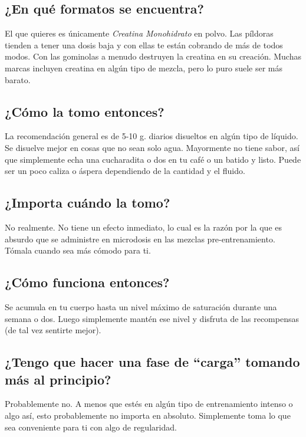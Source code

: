 \documentclass{article}
\begin{document}
\subsection{¿En qué formatos se encuentra?}

El que quieres es únicamente \textit{Creatina Monohidrato} en polvo. Las píldoras tienden a tener una dosis baja y con ellas te están cobrando de más de todos modos. Con las gominolas a menudo destruyen la creatina en su creación. Muchas marcas incluyen creatina en algún tipo de mezcla, pero lo puro suele ser más barato.

\subsection{¿Cómo la tomo entonces?}

La recomendación general es de 5-10 g. diarios disueltos en algún tipo de líquido. Se disuelve mejor en cosas que no sean solo agua. Mayormente no tiene sabor, así que simplemente echa una cucharadita o dos en tu café o un batido y listo. Puede ser un poco caliza o áspera dependiendo de la cantidad y el fluido.

\subsection{¿Importa cuándo la tomo?}

No realmente. No tiene un efecto inmediato, lo cual es la razón por la que es absurdo que se administre en microdosis en las mezclas pre-entrenamiento. Tómala cuando sea más cómodo para ti.

\subsection{¿Cómo funciona entonces?}

Se acumula en tu cuerpo hasta un nivel máximo de saturación durante una semana o dos. Luego simplemente mantén ese nivel y disfruta de las recompensas (de tal vez sentirte mejor).

\subsection{¿Tengo que hacer una fase de “carga” tomando más al principio?}

Probablemente no. A menos que estés en algún tipo de entrenamiento intenso o algo así, esto probablemente no importa en absoluto. Simplemente toma lo que sea conveniente para ti con algo de regularidad.
\end{document}
